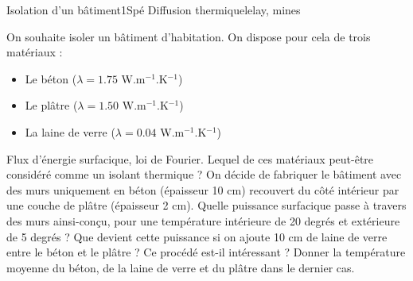 \begin{exercise}{Isolation d'un bâtiment}{1}{Spé}
{Diffusion thermique}{lelay, mines}

On souhaite isoler un bâtiment d'habitation. On dispose pour cela de trois matériaux :
\begin{itemize}
    \item Le béton ($\lambda = 1.75$ W.m$^{-1}$.K$^{-1}$)
    \item Le plâtre ($\lambda = 1.50$ W.m$^{-1}$.K$^{-1}$)
    \item La laine de verre ($\lambda = 0.04$ W.m$^{-1}$.K$^{-1}$)
\end{itemize}

\begin{questions}
    \questioncours Flux d'énergie surfacique, loi de Fourier.
    \question Lequel de ces matériaux peut-être considéré comme un isolant thermique ?
    \question On décide de fabriquer le bâtiment avec des murs uniquement en béton (épaisseur 10 cm) recouvert du côté intérieur par une couche de plâtre (épaisseur 2 cm). Quelle puissance surfacique passe à travers des murs ainsi-conçu, pour une température intérieure de 20 degrés et extérieure de 5 degrés ?
    \question Que devient cette puissance si on ajoute 10 cm de laine de verre entre le béton et le plâtre ? Ce procédé est-il intéressant ?
    \question Donner la température moyenne du béton, de la laine de verre et du plâtre dans le dernier cas. 
\end{questions}

\end{exercise}
